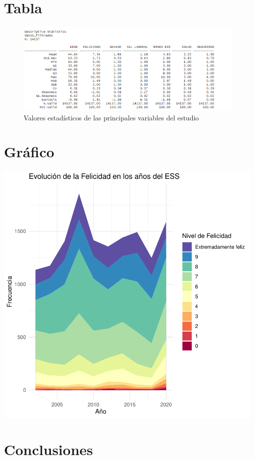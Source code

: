 \documentclass{report}
\begin{document}
\section*{Tabla}

\begin{figure}[h!]
\caption{Valores estadísticos de las principales variables del estudio}
\includegraphics[scale=0.8]{DATOS_FILTRADOS.png}
\end{figure}




\section*{Gráfico}

\includegraphics{Informe-grafico}


\section*{Conclusiones}
\end{document}
